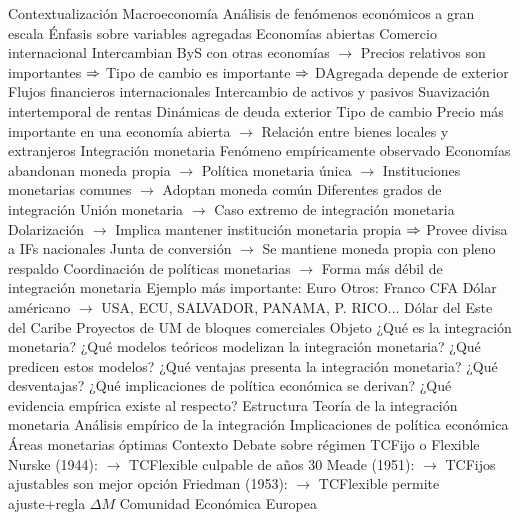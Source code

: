\documentclass{nuevotema}
\begin{document}
\esquemalargo

\begin{esquemal}
	\1[] 
		\2 Contextualización
			\3 Macroeconomía
				\4 Análisis de fenómenos económicos a gran escala
				\4 Énfasis sobre variables agregadas
			\3 Economías abiertas
				\4 Comercio internacional
				\4[] Intercambian ByS con otras economías
				\4[] $\to$ Precios relativos son importantes
				\4[] $\Rightarrow$ Tipo de cambio es importante
				\4[] $\Rightarrow$ DAgregada depende de exterior
				\4 Flujos financieros internacionales
				\4[] Intercambio de activos y pasivos
				\4[] Suavización intertemporal de rentas
				\4[] Dinámicas de deuda exterior
				\4 Tipo de cambio
				\4[] Precio más importante en una economía abierta
				\4[] $\to$ Relación entre bienes locales y extranjeros
			\3 Integración monetaria
				\4 Fenómeno empíricamente observado
				\4 Economías abandonan moneda propia
				\4[] $\to$ Política monetaria única
				\4[] $\to$ Instituciones monetarias comunes
				\4[] $\to$ Adoptan moneda común
				\4 Diferentes grados de integración
				\4[] Unión monetaria
				\4[] $\to$ Caso extremo de integración monetaria
				\4[] Dolarización
				\4[] $\to$ Implica mantener institución monetaria propia
				\4[] $\Rightarrow$ Provee divisa a IFs nacionales
				\4[] Junta de conversión
				\4[] $\to$ Se mantiene moneda propia con pleno respaldo
				\4[] Coordinación de políticas monetarias
				\4[] $\to$ Forma más débil de integración monetaria
				\4 Ejemplo más importante:
				\4[] Euro
				\4 Otros:
				\4[] Franco CFA
				\4[] Dólar américano
				\4[] $\to$ USA, ECU, SALVADOR, PANAMA, P. RICO...
				\4[] Dólar del Este del Caribe
				\4[] Proyectos de UM de bloques comerciales
		\2 Objeto
			\3 ¿Qué es la integración monetaria?
			\3 ¿Qué modelos teóricos modelizan la integración monetaria?
			\3 ¿Qué predicen estos modelos?
			\3 ¿Qué ventajas presenta la integración monetaria?
			\3 ¿Qué desventajas?
			\3 ¿Qué implicaciones de política económica se derivan?
			\3 ¿Qué evidencia empírica existe al respecto?
		\2 Estructura
			\3 Teoría de la integración monetaria
			\3 Análisis empírico de la integración
			\3 Implicaciones de política económica
	\1 
		\2 Áreas monetarias óptimas
			\3 Contexto
				\4 Debate sobre régimen TCFijo o Flexible
				\4[] Nurske (1944):
				\4[] $\to$ TCFlexible culpable de años 30
				\4[] Meade (1951):
				\4[] $\to$ TCFijos ajustables son mejor opción
				\4[] Friedman (1953):
				\4[] $\to$ TCFlexible permite ajuste+regla $\Delta M$
				\4[] Comunidad Económica Europea

\end{esquemal}
\end{document}
